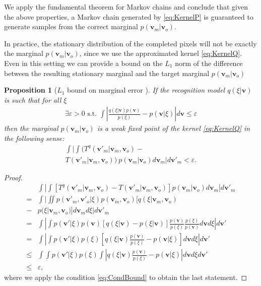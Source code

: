 \documentclass{article}
\newcommand{\vis}{\ensuremath{\mathbf{v}}} %
\newtheorem{proposition}[theorem]{Proposition}
\begin{document}
\begin{bibunit}[icml2013]
We apply the fundamental theorem for Markov chains \citep[pp. 38]{neal93} and conclude that given the above
properties, a Markov chain generated by 
\eqref{eq:KernelP} is guaranteed to generate samples from the correct marginal 
$p(\vis_m| \vis_o)$.

In practice, the stationary distribution of the completed pixels will not be 
exactly the marginal $p(\vis_m| \vis_o)$, since we use the 
approximated kernel \eqref{eq:KernelQ}. 
Even in this setting we can provide a bound on the $L_1$ norm of the 
difference between the resulting 
stationary marginal and the target marginal $p(\vis_m| \vis_o)$ 

\begin{proposition}[$L_1$ bound on marginal error ]
If the recognition model $q ( \xi | \vis)$ is such that for all $\xi$
\begin{align}
\exists \varepsilon >0 \textrm{ s.t. }  \int  \left| \frac{q(\xi | \vis) p(\vis)}{p(\xi)} - p ( \vis | \xi ) \right|  d \vis \leq \varepsilon  \label{eq:CondBound}
\end{align}
then the marginal $p(\vis_m|\vis_o)$ is a weak fixed point of the kernel 
\eqref{eq:KernelQ} in the following sense:
\begin{multline}
\int  \Bigg| \int  \big( T^q( \vis'_m | \vis_m, \vis_o )  -  \\
T( \vis'_m | \vis_m, \vis_o )\big)\ p(\vis_m|\vis_o) d \vis_m \Bigg| d \vis'_m < \varepsilon. 
\label{eq:FixBound}
\end{multline}
\end{proposition}

\vspace{0.5cm}
\begin{proof}
\begin{align} 
& \int \!  \left| \! \int \!\left[ T^q( \vis'_m | \vis_m, \vis_o )  \!-\! 
T( \vis'_m | \vis_m, \vis_o )\right] p(\vis_m|\vis_o)  d \vis_m \right | d \vis'_m \nonumber\\
 = & \int  | \iint   p ( \vis'_m, \vis'_o | \xi) p ( \vis_m, \vis_o) [ q ( \xi |
\vis_m, \vis_o)  \nonumber\\
- &   p ( \xi | \vis_m, \vis_o)]d \vis_m d \xi | d \vis'_m 
\nonumber \\
 = & \int  \left | \int   p ( \vis' | \xi) p ( \vis) [ q ( \xi |
\vis) - p ( \xi | \vis)] \frac{p(\vis)}{p(\xi)} \frac{p(\xi)}{p(\vis)} d \vis d \xi 
\right| d \vis'
\nonumber \\
 = & \int  \left | \int  p ( \vis' | \xi) p ( \xi) [ q ( \xi |
\vis) \frac{p(\vis)}{p(\xi)} - p ( \vis | \xi)] d \vis d \xi \right| d \vis' 
\nonumber \\
\leq & \int  \int  p ( \vis' | \xi) p ( \xi) \int   \left | q ( \xi |
\vis) \frac{p(\vis)}{p(\xi)} - p ( \vis | \xi)  \right| d \vis d \xi d \vis' 
\nonumber \\
\leq & \varepsilon, \nonumber
\end{align}
where we apply the condition \eqref{eq:CondBound} to obtain the last 
statement. 
\end{proof}


\end{bibunit}
\end{document}
